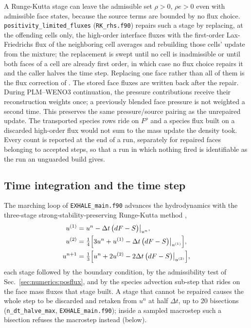 A Runge-Kutta stage can leave the admissible set $\rho>0$, $\rho e>0$ even
with admissible face states, because the source terms are bounded by no flux
choice.  \texttt{positivity\_limited\_fluxes} (\texttt{RK\_rhs.f90}) repairs
such a stage by replacing, at the offending cells only, the high-order
interface fluxes with the first-order Lax-Friedrichs flux of the neighboring
cell averages and rebuilding those cells' update from the mixture; the
replacement is swept until no cell is inadmissible or until both faces of a
cell are already first order, in which case no flux choice repairs it and the
caller halves the time step.  Replacing one face rather than all of them is
the flux correction of \citet{Hu2013}.  The stored face fluxes are written
back after the repair. During PLM--WENO3 continuation, the pressure
contributions receive their reconstruction weights once; a previously
blended face pressure is not weighted a second time. This preserves the
same pressure/source pairing as the unrepaired update. The transported
species rows ride on
$F^\rho$ and a species flux built on a discarded high-order flux would not
sum to the mass update the density took.  Every count is reported at the end
of a run, separately for repaired faces belonging to accepted steps, so that
a run in which nothing fired is identifiable as the run an unguarded build
gives.

\subsection{Time integration and the time step}
\label{sec:numerics:rk}

The marching loop of \texttt{EXHALE\_main.f90} advances the hydrodynamics
with the three-stage strong-stability-preserving Runge-Kutta method
\citep{Gottlieb1998},
%
\begin{equation}
  \begin{aligned}
    u^{(1)} &= u^n - \Delta t\,\bigl(dF - S\bigr)\big|_{u^n},\\
    u^{(2)} &= \tfrac14\Bigl[3u^n + u^{(1)}
               - \Delta t\,\bigl(dF - S\bigr)\big|_{u^{(1)}}\Bigr],\\
    u^{n+1} &= \tfrac13\Bigl[u^n + 2u^{(2)}
               - 2\Delta t\,\bigl(dF - S\bigr)\big|_{u^{(2)}}\Bigr],
  \end{aligned}
  \label{eq:ssprk3}
\end{equation}
%
each stage followed by the boundary condition, by the admissibility test of
Sec.~\ref{sec:numerics:posflux}, and by the species advection sub-step that
rides on the face mass fluxes that stage built.  A stage that cannot be
repaired causes the whole step to be discarded and retaken from $u^n$ at half
$\Delta t$, up to 20 bisections (\texttt{n\_dt\_halve\_max},
\texttt{EXHALE\_main.f90}); inside a sampled macrostep such a bisection
refuses the macrostep instead (below).


